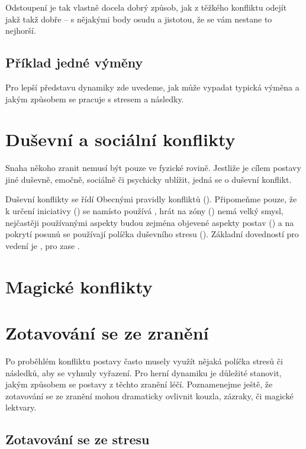 \documentclass[../main.tex]{subfiles}
\begin{document}
Odstoupení je tak vlastně docela dobrý způsob, jak z těžkého konfliktu odejít jakž takž
dobře – s nějakými body osudu a jistotou, že se vám nestane to nejhorší.

\subsection{Příklad jedné výměny}
\label{sec:priklad-vymena}

Pro lepší představu dynamiky zde uvedeme, jak může vypadat typická výměna a jakým
způsobem se pracuje s stresem a následky.

\section{Duševní a sociální konflikty}
\label{sec:dusevni-soc-konflikty}

Snaha někoho zranit nemusí být pouze ve fyzické rovině. Jestliže je cílem postavy jiné
duševně, emočně, sociálně či psychicky ublížit, jedná se o duševní konflikt.

Duševní konflikty se řídí Obecnými pravidly konfliktů ().
Připomeňme pouze, že k určení iniciativy () se namísto
 používá , hrát na zóny () nemá velký
smysl, nejčastěji používanými aspekty budou zejména objevené aspekty postav
() a na pokrytí posunů se používají políčka duševního stresu
(). Základní dovedností pro vedení  je , pro
 zase .

\section{Magické konflikty}
\label{sec:magicke-konflikty}

\section{Zotavování se ze zranění}
\label{sec:zotavovanise}

Po proběhlém konfliktu postavy často musely využít nějaká políčka stresů či následků, aby
se vyhnuly vyřazení. Pro herní dynamiku je důležité stanovit, jakým způsobem se postavy z
těchto zranění léčí. Poznamenejme ještě, že zotavování se ze zranění mohou dramaticky
ovlivnit kouzla, zázraky, či magické lektvary.

\subsection{Zotavování se ze stresu}
\label{sec:zot-stresy}
\end{document}
